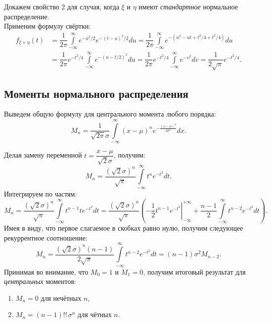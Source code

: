 \documentclass[11pt,a4paper]{article}
\providecommand{\tightlist}{%
      \setlength{\itemsep}{0pt}\setlength{\parskip}{0pt}}
\begin{document}
    Докажем свойство 2 для случая, когда \(\xi\) и \(\eta\) имеют
\emph{стандартное} нормальное распределение.\\
Применим формулу свёртки: \[
\begin{split}
  f_{\xi+\eta}(t)
  &= \dfrac{1}{2\pi} \int\limits_{-\infty}^{\infty} e^{-{u^2}/{2}} e^{-{(t-u)^2}/{2}} du
  = \dfrac{1}{2\pi} \int\limits_{-\infty}^{\infty} e^{-\left( u^2 - ut + t^2/4 + t^2/4 \right)} du \\
  &= \dfrac{1}{2\pi} e^{-t^2/4} \int\limits_{-\infty}^{\infty} e^{-\left( u - t/2 \right)^2} du
  = \dfrac{1}{2\pi} e^{-t^2/4} \int\limits_{-\infty}^{\infty} e^{-v^2}dv
  = \dfrac{1}{2\sqrt{\pi}} e^{-t^2/4}.
\end{split}
\]

    \hypertarget{ux43cux43eux43cux435ux43dux442ux44b-ux43dux43eux440ux43cux430ux43bux44cux43dux43eux433ux43e-ux440ux430ux441ux43fux440ux435ux434ux435ux43bux435ux43dux438ux44f}{%
\subsection{Моменты нормального
распределения}\label{ux43cux43eux43cux435ux43dux442ux44b-ux43dux43eux440ux43cux430ux43bux44cux43dux43eux433ux43e-ux440ux430ux441ux43fux440ux435ux434ux435ux43bux435ux43dux438ux44f}}

Выведем общую формулу для центрального момента любого порядка: \[
  M_n = \dfrac{1}{\sqrt{2\pi}\sigma} \int\limits_{-\infty}^{\infty}(x-\mu)^n e^{-\frac{(x-\mu)^2}{2\sigma^2}}dx.
\]

Делая замену переменной \(t = \dfrac{x-\mu}{\sqrt{2}\sigma}\), получим:
\[
  M_n = \dfrac{(\sqrt{2}\sigma)^n}{\sqrt{\pi}} \int\limits_{-\infty}^{\infty}t^n e^{-t^2}dt.
\]
Интегрируем по частям: \[
  M_n = \dfrac{(\sqrt{2}\sigma)^n}{\sqrt{\pi}} \int\limits_{-\infty}^{\infty}t^{n-1}t e^{-t^2}dt
  = \dfrac{(\sqrt{2}\sigma)^n}{\sqrt{\pi}} \left( \left.-\dfrac{1}{2}t^{n-1}e^{-t^2} \right|_{-\infty}^{+\infty}
  + \dfrac{n-1}{2} \int\limits_{-\infty}^{\infty}t^{n-2} e^{-t^2}dt \right).
\]
Имея в виду, что первое слагаемое в скобках равно нулю, получим
следующее рекуррентное соотношение: \[
  M_n = \dfrac{(\sqrt{2}\sigma)^n (n-1)}{2\sqrt{\pi}} \int\limits_{-\infty}^{\infty}t^{n-2} e^{-t^2}dt 
  = (n-1) \sigma^2 M_{n-2}.
\]
    Принимая во внимание, что \(M_0=1\) и \(M_1=0\), получим итоговый
результат для \emph{центральных} моментов:

\begin{enumerate}
\def\labelenumi{\arabic{enumi}.}
\tightlist
\item
  \(M_n = 0\) для нечётных \(n\),
\item
  \(M_n = (n-1)!!\,\sigma^n\) для чётных \(n\).
\end{enumerate}
\end{document}
